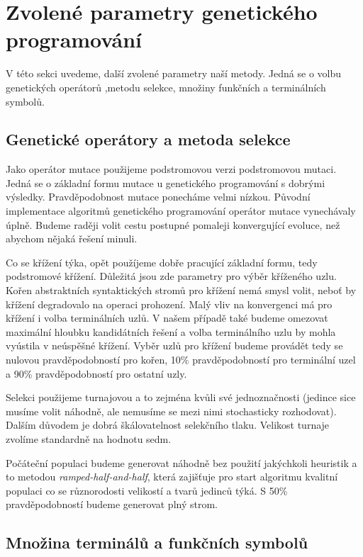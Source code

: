 \section{Zvolené parametry genetického programování}

V této sekci uvedeme, další zvolené parametry naší metody. Jedná se o volbu genetických operátorů
,metodu selekce, množiny funkčních a terminálních symbolů. 

\subsection{Genetické operátory a metoda selekce}

Jako operátor mutace použijeme podstromovou verzi podstromovou mutaci. Jedná se o základní formu mutace
u genetického programování s dobrými výsledky.
Pravděpodobnost mutace ponecháme velmi nízkou. Původní implementace algoritmů
genetického programování \cite{GPTutorial} operátor mutace vynechávaly úplně. 
Budeme raději volit cestu postupné pomaleji konvergující evoluce, než abychom 
nějaká řešení minuli. 

Co se křížení týka, opět použíjeme dobře pracující základní formu, tedy podstromové křížení. Důležitá jsou zde parametry pro výběr kříženého uzlu. 
Kořen abstraktních syntaktických stromů pro křížení nemá smysl volit, neboť by křížení degradovalo na operaci prohození. Malý vliv na konvergenci
má  pro křížení i volba terminálních uzlů. V našem případě také budeme omezovat maximální hloubku kandidátních řešení a volba terminálního uzlu
by mohla vyústila v neúspěšné křížení. Vyběr uzlů pro křížení budeme provádět tedy se nulovou pravděpodobností pro kořen, 10\% pravděpodobností
pro terminální uzel a 90\% pravděpodobností pro ostatní uzly.

Selekci použijeme turnajovou a to zejména kvůli své jednoznačnosti (jedince sice musíme volit náhodně, ale nemusíme se mezi nimi stochasticky rozhodovat).
Dalším důvodem je dobrá škálovatelnost selekčního tlaku. Velikost turnaje zvolíme standardně na hodnotu sedm.

Počáteční populaci budeme generovat náhodně bez použití jakýchkoli heuristik a to metodou \textit{ramped-half-and-half}, která zajišťuje pro start algoritmu
kvalitní populaci co se různorodosti velikostí a tvarů jedinců týká. S 50\% pravděpodobností budeme generovat plný strom.

\subsection{Množina terminálů a funkčních symbolů}

